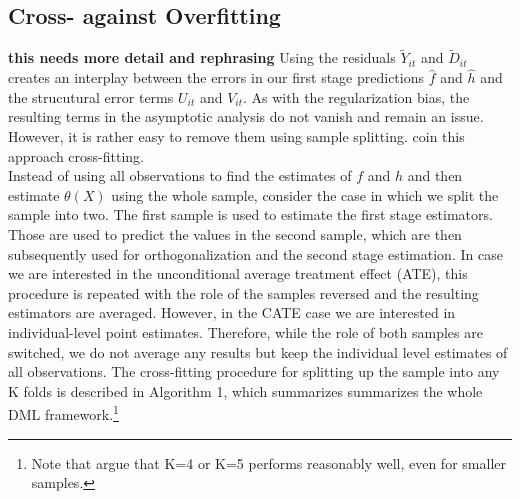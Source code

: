 
\subsection{Cross- against Overfitting} \label{sec:cross-fitting}
\textbf{this needs more detail and rephrasing}
Using the residuals $\tilde{Y}_{it}$ and $\tilde{D}_{it}$ creates an interplay between the errors in our first stage predictions $\hat{f}$ and $\hat{h}$ and the strucutural error terms $U_{it}$ and $V_{it}$. As with the regularization bias, the resulting terms in the asymptotic analysis do not vanish and remain an issue. However, it is rather easy to remove them using sample splitting. \cite{DML2017} coin this approach cross-fitting. \\ 
Instead of using all observations to find the estimates of $f$ and $h$ and then estimate $\theta(X)$ using the whole sample, consider the case in which we split the sample into two. The first sample is used to estimate the first stage estimators. Those are used to predict the values in the second sample, which are then subsequently used for orthogonalization and the second stage estimation. In case we are interested in the unconditional average treatment effect (ATE), this procedure is repeated with the role of the samples reversed and the resulting estimators are averaged. However, in the CATE case we are interested in individual-level point estimates. Therefore, while the role of both samples are switched, we do not average any results but keep the individual level estimates of all observations. The cross-fitting procedure for splitting up the sample into any K folds is described in Algorithm 1, which summarizes summarizes the whole DML framework.\footnote{Note that \cite{DML2017} argue that K=4 or K=5 performs reasonably well, even for smaller samples.} 

